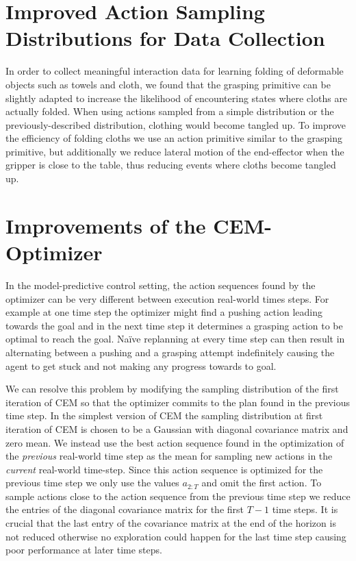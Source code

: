 \section{Improved Action Sampling Distributions for Data Collection}
\label{sec:folding_sampling}
In order to collect meaningful interaction data for learning folding of deformable objects such as towels and cloth, we found that the grasping primitive can be slightly adapted to increase the likelihood of encountering states where cloths are actually folded. When using actions sampled from a simple distribution or the previously-described distribution, clothing would become tangled up. To improve the efficiency of folding cloths we use an action primitive similar to the grasping primitive, but additionally we reduce lateral motion of the end-effector when the gripper is close to the table, thus reducing events where cloths become tangled up.

\section{Improvements of the CEM-Optimizer}
\label{sec:cem_improv}
In the model-predictive control setting, the action sequences found by the optimizer can be very different between execution real-world times steps. For example at one time step the optimizer might find a pushing action leading towards the goal and in the next time step it determines a grasping action to be optimal to reach the goal. Na\"{i}ve replanning at every time step can then result in alternating between a pushing and a grasping attempt indefinitely causing the agent to get stuck and not making any progress towards to goal. 

We can resolve this problem by modifying the sampling distribution of the first iteration of CEM so that the optimizer commits to the plan found in the previous time step. In the simplest version of CEM the sampling distribution at first iteration of CEM is chosen to be a Gaussian with diagonal covariance matrix and zero mean. We instead use the best action sequence found in the optimization of the \emph{previous} real-world time step as the mean for sampling new actions in the \emph{current} real-world time-step. Since this action sequence is optimized for the previous time step we only use the values $a_{2:T}$ and omit the first action. To sample actions close to the action sequence from the previous time step we reduce the entries of the diagonal covariance matrix for the first $T-1$ time steps. It is crucial that the last entry of the covariance matrix at the end of the horizon is not reduced otherwise no exploration could happen for the last time step causing poor performance at later time steps.

